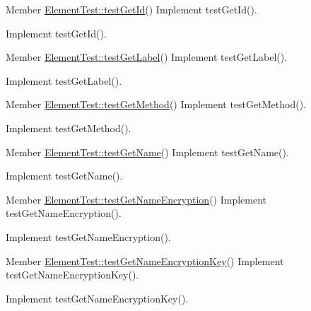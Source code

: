 \begin{DoxyDescription}
\item[Member \hyperlink{class_element_test_a9231e9c3534abf04eb0c88ad68084882}{ElementTest::testGetId}() ]Implement testGetId().

Implement testGetId().
\end{DoxyDescription}

\label{todo__todo000111}
\hypertarget{todo__todo000111}{}
 
\begin{DoxyDescription}
\item[Member \hyperlink{class_element_test_a55e565b9c7813d8c3e26162ca0498ba1}{ElementTest::testGetLabel}() ]Implement testGetLabel().

Implement testGetLabel().
\end{DoxyDescription}

\label{todo__todo000115}
\hypertarget{todo__todo000115}{}
 
\begin{DoxyDescription}
\item[Member \hyperlink{class_element_test_a4a0b2f826196a62840fae918ee0c6970}{ElementTest::testGetMethod}() ]Implement testGetMethod().

Implement testGetMethod().
\end{DoxyDescription}

\label{todo__todo000109}
\hypertarget{todo__todo000109}{}
 
\begin{DoxyDescription}
\item[Member \hyperlink{class_element_test_a8582a7bb093ec85856a19e1c1b7cb983}{ElementTest::testGetName}() ]Implement testGetName().

Implement testGetName().
\end{DoxyDescription}

\label{todo__todo000130}
\hypertarget{todo__todo000130}{}
 
\begin{DoxyDescription}
\item[Member \hyperlink{class_element_test_aca615966ec942ed98964607789fc499a}{ElementTest::testGetNameEncryption}() ]Implement testGetNameEncryption().

Implement testGetNameEncryption().
\end{DoxyDescription}

\label{todo__todo000131}
\hypertarget{todo__todo000131}{}
 
\begin{DoxyDescription}
\item[Member \hyperlink{class_element_test_a3c513ba39c243a7eb1648fb05e54e3de}{ElementTest::testGetNameEncryptionKey}() ]Implement testGetNameEncryptionKey().

Implement testGetNameEncryptionKey().
\end{DoxyDescription}

